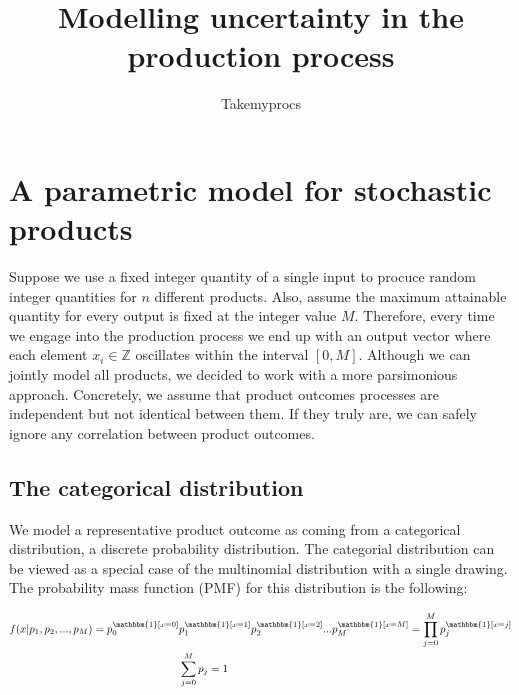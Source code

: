 \documentclass[12pt]{article}         %
\title{Modelling uncertainty in the production process}
\author{Takemyprocs}
\begin{document}


\maketitle


\section{A parametric model for stochastic products}
Suppose we use a fixed integer quantity of a single input to procuce random integer quantities for $n$ different products. Also, assume the maximum attainable quantity for every output is fixed at the integer value $M$. Therefore, every time we engage into the production process we end up with an output vector where each element $x_i\in \mathbb{Z}$ oscillates within the interval $[0,M]$. Although we can jointly model all products, we decided to work with a more parsimonious approach. Concretely, we assume that product outcomes processes are independent but not identical between them. If they truly are, we can safely ignore any correlation between product outcomes.

\subsection{The categorical distribution}
We model a representative product outcome as coming from a categorical distribution, a discrete probability distribution. The categorial distribution can be viewed as a special case of the multinomial distribution with a single drawing. The probability mass function (PMF) for this distribution is the following:

\begin{equation}
\begin{split}
f(x\vert p_1,p_2,...,p_M) = p_0^{\mathbbm{1}[x=0]} & p_1^{\mathbbm{1}[x=1]}p_2^{\mathbbm{1}[x=2]}...p_M^{\mathbbm{1}[x=M]} = \prod_{j=0}^M p_j^{\mathbbm{1}[x=j]} \\
&\sum_{j=0}^M p_j = 1
\end{split}
\end{equation}
\end{document}
